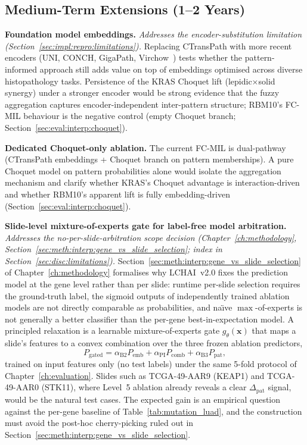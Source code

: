 \subsection{Medium-Term Extensions (1--2 Years)}
\label{sec:disc:future:medium}

\textbf{Foundation model embeddings.}
\emph{Addresses the encoder-substitution limitation
(Section~\ref{sec:impl:repro:limitations}).}
Replacing CTransPath with more recent encoders
(UNI, CONCH, GigaPath, Virchow~\cite{chen2024uni,xu2024gigapath})
tests whether the pattern-informed approach still adds value on
top of embeddings optimised across diverse histopathology tasks.
Persistence of the KRAS Choquet lift (lepidic$\times$solid
synergy) under a stronger encoder would be strong evidence that
the fuzzy aggregation captures encoder-independent inter-pattern
structure; RBM10's FC-MIL behaviour is the negative control
(empty Choquet branch; Section~\ref{sec:eval:interp:choquet}).

\textbf{Dedicated Choquet-only ablation.}
The current FC-MIL is dual-pathway (CTransPath embeddings +
Choquet branch on pattern memberships).
A pure Choquet model on pattern probabilities alone would isolate
the aggregation mechanism and clarify whether KRAS's Choquet
advantage is interaction-driven and whether RBM10's apparent lift
is fully embedding-driven (Section~\ref{sec:eval:interp:choquet}).

\textbf{Slide-level mixture-of-experts gate for label-free model arbitration.}
\label{sec:disc:future:moe_gate}
\emph{Addresses the no-per-slide-arbitration scope decision
(Chapter~\ref{ch:methodology},
Section~\ref{sec:meth:interp:gene_vs_slide_selection}; index in
Section~\ref{sec:disc:limitations}).}
Section~\ref{sec:meth:interp:gene_vs_slide_selection} of
Chapter~\ref{ch:methodology} formalises why LCHAI~v2.0 fixes the
prediction model at the gene level rather than per slide:
runtime per-slide selection requires the ground-truth label,
the sigmoid outputs of independently trained ablation models are
not directly comparable as probabilities, and na\"{\i}ve
$\max$-of-experts is not generally a better classifier than the
per-gene best-in-expectation model.
A principled relaxation is a learnable mixture-of-experts gate
$g_\theta(\mathbf{x})$ that maps a slide's features to a convex
combination over the three frozen ablation predictors,
\[
P_{\text{gated}}
= \alpha_{\text{B2}} P_{\text{emb}}
+ \alpha_{\text{PI}} P_{\text{comb}}
+ \alpha_{\text{B3}} P_{\text{pat}},
\]
trained on input features only (no test labels) under the same
5-fold protocol of Chapter~\ref{ch:evaluation}.
Slides such as TCGA-49-AAR9 (KEAP1) and TCGA-49-AAR0 (STK11),
where Level~5 ablation already reveals a clear
$\Delta_{\text{pat}}$ signal, would be the natural test cases.
The expected gain is an empirical question against the per-gene
baseline of Table~\ref{tab:mutation_luad}, and the construction
must avoid the post-hoc cherry-picking ruled out in
Section~\ref{sec:meth:interp:gene_vs_slide_selection}.


